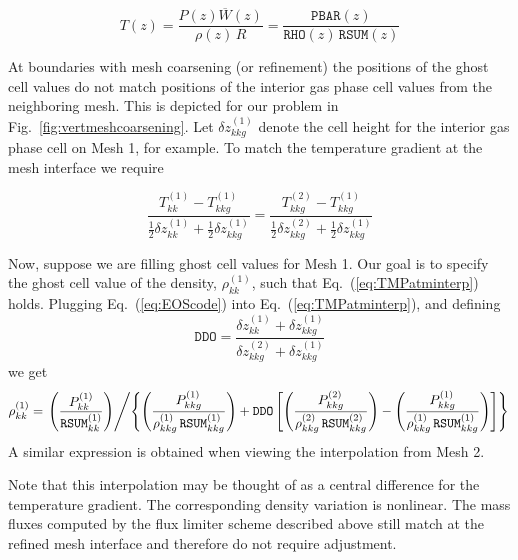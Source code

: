 \begin{equation}
\label{eq:EOScode}
T(z) = \frac{P(z) \overline{W}(z)}{\rho(z) \, R} = \frac{\mathtt{PBAR}(z)}{\mathtt{RHO}(z) \, \mathtt{RSUM}(z)}
\end{equation}

At  boundaries with mesh coarsening (or refinement) the positions of the ghost cell values do not match positions of the interior gas phase cell values from the neighboring mesh.  This is depicted for our problem in Fig.~\ref{fig:vertmeshcoarsening}.  Let $\delta z^{(1)}_{kkg}$ denote the cell height for the interior gas phase cell on Mesh 1, for example.  To match the temperature gradient at the mesh interface we require

\begin{equation}
\label{eq:TMPatminterp}
\frac{T^{(1)}_{kk} - T^{(1)}_{kkg}}{\mbox{$\frac{1}{2}$} \delta z^{(1)}_{kk} + \mbox{$\frac{1}{2}$}\delta z^{(1)}_{kkg}} = \frac{T^{(2)}_{kkg} - T^{(1)}_{kkg}}{\mbox{$\frac{1}{2}$} \delta z^{(2)}_{kkg} + \mbox{$\frac{1}{2}$}\delta z^{(1)}_{kkg}}
\end{equation}

Now, suppose we are filling ghost cell values for Mesh 1.  Our goal is to specify the ghost cell value of the density, $\rho^{(1)}_{kk}$, such that Eq.~(\ref{eq:TMPatminterp}) holds.  Plugging Eq.~(\ref{eq:EOScode}) into Eq.~(\ref{eq:TMPatminterp}), and defining
\begin{equation}
\label{eq:ddofactor}
\mathtt{DDO} = \frac{\delta z^{(1)}_{kk} + \delta z^{(1)}_{kkg}}{\delta z^{(2)}_{kkg} + \delta z^{(1)}_{kkg}}
\end{equation}
we get
\begin{equation}
\label{eq:atmrhoghost}
\rho^{(1)}_{kk} = \left. \left( \frac{P^{(1)}_{kk}}{\mathtt{RSUM}^{(1)}_{kk}} \right) \middle/ \left\{ \left(\frac{P^{(1)}_{kkg}}{\rho^{(1)}_{kkg}\,\mathtt{RSUM}^{(1)}_{kkg}}\right) + \mathtt{DDO}\left[ \left(\frac{P^{(2)}_{kkg}}{\rho^{(2)}_{kkg}\,\mathtt{RSUM}^{(2)}_{kkg}}\right) - \left(\frac{P^{(1)}_{kkg}}{\rho^{(1)}_{kkg}\,\mathtt{RSUM}^{(1)}_{kkg}}\right) \right] \right\} \right.
\end{equation}
A similar expression is obtained when viewing the interpolation from Mesh 2.

Note that this interpolation may be thought of as a central difference for the temperature gradient.  The corresponding density variation is nonlinear.  The mass fluxes computed by the flux limiter scheme described above still match at the refined mesh interface and therefore do not require adjustment.

